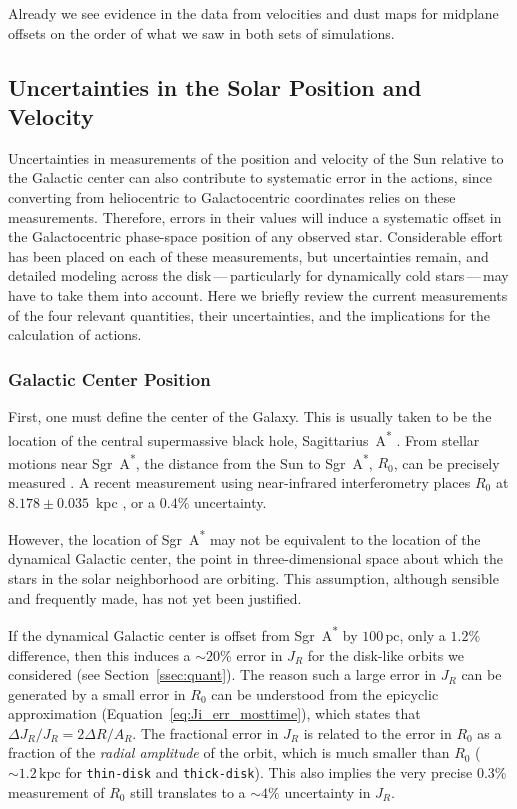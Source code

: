 \documentclass[twocolumn]{aastex62}
\newcommand{\pc}{\text{pc}}
\newcommand{\kpc}{\text{kpc}}
\newcommand{\sgra}{Sgr~A\textsuperscript{*}}
\newcommand{\thin}{\texttt{thin-disk}}
\newcommand{\thick}{\texttt{thick-disk}}
\begin{document}
Already we see evidence in the data from velocities and dust maps for midplane
offsets on the order of what we saw in both sets of simulations.

\subsection{Uncertainties in the Solar Position and Velocity}\label{ssec:coord_off}

Uncertainties in measurements of the position and velocity of the Sun relative
to the Galactic center can also contribute to systematic error in the actions, since converting from heliocentric to Galactocentric
coordinates relies on these measurements. Therefore, errors in their values
will induce a systematic offset in the Galactocentric phase-space position of
any observed star. Considerable effort has been placed on each of these measurements, but uncertainties remain, and detailed modeling across the disk\,---\,particularly for dynamically cold stars\,---\,may have to take them into
account.
Here we briefly review the current measurements of the four relevant quantities, 
their uncertainties, and the implications for the calculation of actions.

\subsubsection{Galactic Center Position}
First, one must define the center of the Galaxy. This is usually taken to be
the location of the central supermassive black hole, Sagittarius~A\textsuperscript{*}
\citep[\sgra{}, e.g.,][]{2004ApJ...616..872R}. From stellar motions near
\sgra{}, the distance from the Sun to \sgra{}, $R_0$, can be
precisely measured \citep{2009ApJ...692.1075G, 2018AA...615L..15G}. A
recent measurement using near-infrared interferometry places $R_0$ at $8.178 \pm 0.035$~kpc
\citep{2019arXiv190405721A}, or a $0.4\%$ 
uncertainty.

However, the location of \sgra{} may not be equivalent to the location
of the dynamical Galactic center, the
point in three-dimensional space about which the stars in the solar
neighborhood are orbiting. This assumption, although sensible and frequently
made, has not yet been justified.

If the dynamical Galactic center is offset from \sgra{} by $100\,\pc$, only a
$1.2\%$ difference, then this induces a $\sim20\%$ error in $J_R$ for the disk-like orbits we considered (see
Section~\ref{ssec:quant}). The reason such a large error in $J_R$ can be
generated by a small error in $R_0$ can be understood from the epicyclic
approximation (Equation~\eqref{eq:Ji_err_mosttime}),
which states that $\Delta J_R/J_R = 2\Delta R/A_R$. The
fractional error in $J_R$ is related to the error in $R_0$ as a fraction of
the \emph{radial amplitude} of the orbit, which is much smaller than $R_0$
($\sim1.2\,\kpc$ for \thin{} and \thick{}). This
also implies the very precise $0.3\%$ measurement of $R_0$ still translates to
a $\sim4\%$ uncertainty in $J_R$.
\end{document}

